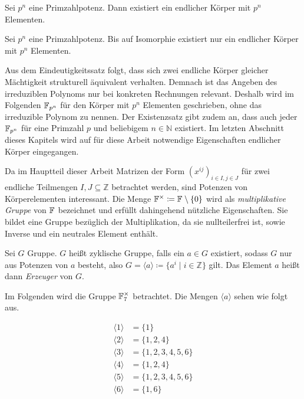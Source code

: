 \begin{satz}
    Sei $p^n$ eine Primzahlpotenz. Dann existiert ein endlicher Körper mit $p^n$ Elementen.
\end{satz}

\begin{satz}
    Sei $p^n$ eine Primzahlpotenz. Bis auf Isomorphie existiert nur ein endlicher Körper mit $p^n$ Elementen.
\end{satz}

Aus dem Eindeutigkeitssatz folgt, dass sich zwei endliche Körper gleicher Mächtigkeit strukturell äquivalent verhalten. Demnach ist das Angeben des irreduziblen Polynoms nur bei konkreten Rechnungen relevant. Deshalb wird im Folgenden $\field{p}[n]$ für den Körper mit $p^n$ Elementen geschrieben, ohne das irreduzible Polynom zu nennen. Der Existenzsatz gibt zudem an, dass auch jeder $\field{p}[n]$ für eine Primzahl $p$ und beliebigem $n \in \mathbb{N}$ existiert. Im letzten Abschnitt dieses Kapitels wird auf für diese Arbeit notwendige Eigenschaften endlicher Körper eingegangen.

Da im Hauptteil dieser Arbeit Matrizen der Form $\left( x^{ij} \right)_{i \in I,j \in J}$ für zwei endliche Teilmengen $I,J \subseteq \mathbb{Z}$ betrachtet werden, sind Potenzen von Körperelementen interessant. Die Menge $\field{}^\times \coloneqq \field{} \setminus \{0\}$ wird als \emph{multiplikative Gruppe} von $\field{}$ bezeichnet und erfüllt dahingehend nützliche Eigenschaften. Sie bildet eine Gruppe bezüglich der Multiplikation, da sie nullteilerfrei ist, sowie Inverse und ein neutrales Element enthält.

\begin{definition}
    Sei $G$ Gruppe. $G$ heißt zyklische Gruppe, falls ein $a \in G$ existiert, sodass $G$ nur aus Potenzen von $a$ besteht, also $G = \langle a \rangle \coloneqq \{ a^i \mid i \in \mathbb{Z}\}$ gilt. Das Element $a$ heißt dann \emph{Erzeuger} von $G$.
\end{definition}

Im Folgenden wird die Gruppe $\field{7}^\times$ betrachtet. Die Mengen $\langle a \rangle$ sehen wie folgt aus.

\begin{align*}
    \langle 1 \rangle &= \{ 1\} \\
    \langle 2 \rangle &= \{ 1,2,4\} \\
    \langle 3 \rangle &= \{ 1,2,3,4,5,6\} \\
    \langle 4 \rangle &= \{ 1,2,4\} \\
    \langle 5 \rangle &= \{ 1,2,3,4,5,6\} \\
    \langle 6 \rangle &= \{ 1,6\} \\
\end{align*}

